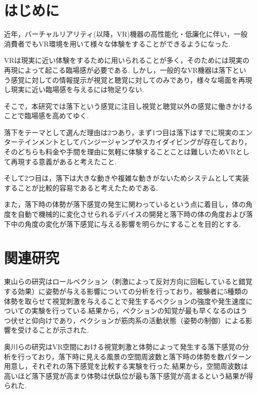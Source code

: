 \documentclass[uplatex]{jsarticle}
\begin{document}
\vspace{3mm}

\setcounter{page}{9}

\section{はじめに}
近年，バーチャルリアリティ(以降，VR)機器の高性能化・低廉化に伴い，一般消費者でもVR環境を用いて様々な体験をすることができるようになった.

VRは現実に近い体験をするために用いられることが多く，そのためには現実の再現によって起こる臨場感が必要である.
しかし，一般的なVR機器は落下という感覚に対しての情報提示が視覚と聴覚に対してのみであり，様々な場面を再現し現実に近い臨場感を与えるには物足りない.

そこで，本研究では落下という感覚に注目し視覚と聴覚以外の感覚に働きかけることで臨場感を高めてゆく.

落下をテーマとして選んだ理由は2つあり，まず1つ目は落下はすでに現実のエンターテインメントとしてバンジージャンプやスカイダイビングが存在しており，そのどちらも料金や手間を理由に気軽に体験することことは難しいためVRとして再現する意義があると考えたこと.

そして2つ目は，落下は大きな動きや複雑な動きがないためシステムとして実装することが比較的容易であると考えたためである.

また，落下時の体勢が落下感覚の発生に関わっているという点に着目し，体の角度を自動で機械的に変化させられるデバイスの開発と落下時の体の角度および落下中の角度の変化が落下感覚に与える影響を明らかにすることを目的とする.



\section{関連研究}
東山らの研究\cite{vection}はロールベクション（刺激によって反対方向に回転していると錯覚する効果）に姿勢が与える影響についての分析を行っており，被験者に5種類の体勢を取らせて視覚刺激を与えることで発生するベクションの強度や発生速度についての実験を行っている.結果から，ベクションの知覚が最も早くなるのはうつ伏せと仰向けであり，ベクションが筋肉系の活動状態（姿勢の制御）による影響を受けることが示された.

奥川らの研究\cite{spatial_stimulation_effect_falling}はVR空間における視覚刺激と体勢によって発生する落下感覚の分析を行っており，落下時に見える風景の空間周波数と落下時の体勢を数パターン用意し，それぞれの落下感覚を比較する実験を行った.結果から，空間周波数は高いほど落下感覚が高まり体勢は伏臥位が最も落下感覚が高まるという結果が得られた.
\end{document}
